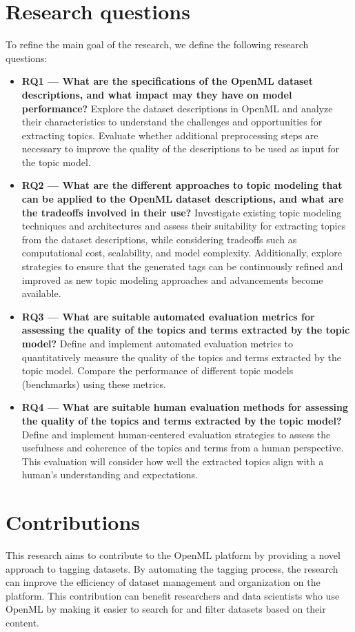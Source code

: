 \section{Research questions}
To refine the main goal of the research, we define the following research questions:
\begin{itemize}
    \item{\textbf{RQ1 — What are the specifications of the OpenML dataset descriptions, and what impact may they have on model performance?}} Explore the dataset descriptions in OpenML and analyze their characteristics to understand the challenges and opportunities for extracting topics. Evaluate whether additional preprocessing steps are necessary to improve the quality of the descriptions to be used as input for the topic model.
    \item{\textbf{RQ2 — What are the different approaches to topic modeling that can be applied to the OpenML dataset descriptions, and what are the tradeoffs involved in their use?}} Investigate existing topic modeling techniques and architectures and assess their suitability for extracting topics from the dataset descriptions, while considering tradeoffs such as computational cost, scalability, and model complexity. Additionally, explore strategies to ensure that the generated tags can be continuously refined and improved as new topic modeling approaches and advancements become available.
    \item{\textbf{RQ3 — What are suitable automated evaluation metrics for assessing the quality of the topics and terms extracted by the topic model?}} Define and implement automated evaluation metrics to quantitatively measure the quality of the topics and terms extracted by the topic model. Compare the performance of different topic models (benchmarks) using these metrics.
    \item{\textbf{RQ4 — What are suitable human evaluation methods for assessing the quality of the topics and terms extracted by the topic model?}} Define and implement human-centered evaluation strategies to assess the usefulness and coherence of the topics and terms from a human perspective. This evaluation will consider how well the extracted topics align with a human's understanding and expectations.
\end{itemize}

\section{Contributions}
This research aims to contribute to the OpenML platform by providing a novel approach to tagging datasets. By automating the tagging process, the research can improve the efficiency of dataset management and organization on the platform. This contribution can benefit researchers and data scientists who use OpenML by making it easier to search for and filter datasets based on their content.

